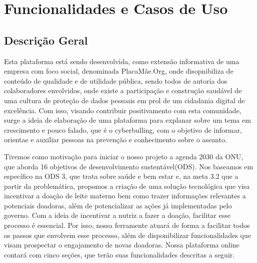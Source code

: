 \chapter{Funcionalidades e Casos de Uso}
\section{Descrição Geral}
\label{sec:descricao}
Esta plataforma está sendo desenvolvida, como extensão informativa de uma empresa com foco social, denominada PlacaMãe.Org, onde disopnibiliza de conteúdo de qualidade e de utilidade pública, sendo todos de autoria dos colaboradores envolvidos, onde existe a participação e construção saudável de uma cultura de proteção de dados pessoais em prol de um cidadania digital de excelência.
Com isso, visando contribuir positivamento com esta comunidade, surge a ideia de elaboração de uma plataforma para explanar sobre um tema em crescimento e pouco falado, que é o cyberbulling, com o objetivo de informar, orientae e auxiliar pessoas na prevenção e conhecimento sobre o assunto.


Tivemos como motivação para iniciar o nosso projeto a agenda 2030 da ONU, que aborda 16 objetivos de desenvolvimento sustentável(ODS). Nos baseamos em específico na ODS 3, que trata sobre saúde e bem estar e, na meta 3.2 que
a partir da problemática, propomos a criação de uma solução tecnológica que visa incentivar a doação de leite materno bem como trazer informações relevantes a potenciais doadoras, além de potencializar as ações já implementadas pelo governo.
Com a ideia de incentivar a nutriz a fazer a doação, facilitar esse processo é essencial. Por isso, nossa ferramente atuará de forma a facilitar todos os passos que envolvem esse processo, além de disponibilizar funcionalidades que visam prospectar o engajamento de novas doadoras. 
Nossa plataforma online contará com cinco seções, que terão suas funcionalidades descritas a seguir. 

